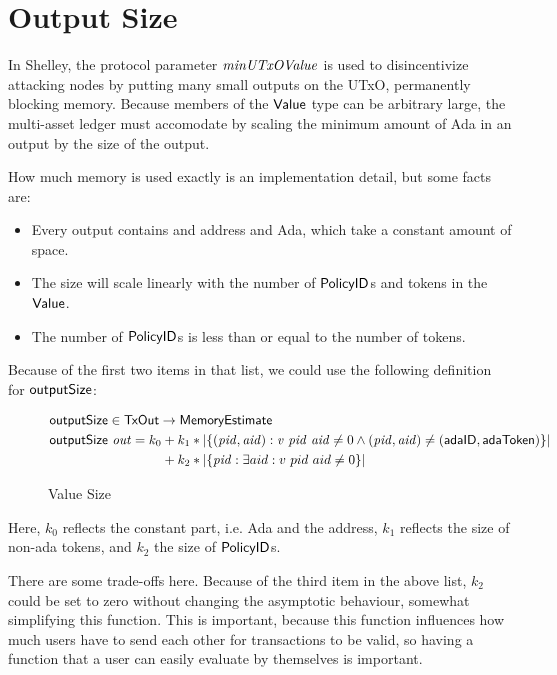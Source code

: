 \section{Output Size}
\label{sec:value-size}

In Shelley, the protocol parameter $\mathit{minUTxOValue}$ is used to
disincentivize attacking nodes by putting many small outputs on the
UTxO, permanently blocking memory. Because members of the $\mathsf{Value}$
type can be arbitrary large, the multi-asset ledger must
accomodate by scaling the minimum amount of Ada in an output by the
size of the output.

How much memory is used exactly is an implementation detail, but some facts are:
\begin{itemize}
  \item Every output contains and address and Ada, which take a constant amount of space.
  \item The size will scale linearly with the number of $\mathsf{PolicyID}$s and tokens in the $\mathsf{Value}$.
  \item The number of $\mathsf{PolicyID}$s is less than or equal to the number of tokens.
\end{itemize}

Because of the first two items in that list, we could use the following definition for $\mathsf{outputSize}$:

\begin{figure*}[h]
  \begin{align*}
    & \fun{outputSize} \in \TxOut \to \MemoryEstimate \\
    & \fun{outputSize} ~\var{out} = k_0 + k_1 * |\{ (\var{pid}, \var{aid}) : \var{v}~\var{pid}~\var{aid} \neq 0
            \land (\var{pid}, \var{aid}) \neq (\mathsf{adaID}, \mathsf{adaToken}) \}| \\
    & \phantom{\fun{outputSize} ~\var{out} = k_0} + k_2 * |\{ \var{pid} : \exists aid : v~pid~aid \neq 0 \}|
  \end{align*}
  \caption{Value Size}
  \label{fig:test}
\end{figure*}

Here, $k_0$ reflects the constant part, i.e. Ada and the address, $k_1$ reflects the
size of non-ada tokens, and $k_2$ the size of $\mathsf{PolicyID}$s.

There are some trade-offs here. Because of the third item in the above
list, $k_2$ could be set to zero without changing the asymptotic
behaviour, somewhat simplifying this function. This is important,
because this function influences how much users have to send each
other for transactions to be valid, so having a function that a user
can easily evaluate by themselves is important.

